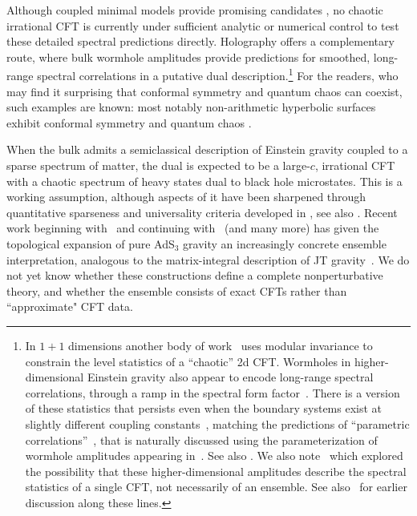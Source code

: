 \documentclass[11pt]{article}
\numberwithin{equation}{section}
\begin{document}
Although coupled minimal models provide promising candidates \cite{Antunes:2022vtb,Antunes:2024mfb}, no chaotic irrational CFT is currently under sufficient analytic or numerical control to test these detailed spectral predictions directly. Holography offers a complementary route, where bulk wormhole amplitudes provide predictions for smoothed, long-range spectral correlations in a putative dual description.\footnote{In $1+1$ dimensions another body of work~\cite{Haehl:2023tkr,DiUbaldo:2023qli,Haehl:2023xys,Haehl:2023mhf,Boruch:2025ilr} uses modular invariance to constrain the level statistics of a ``chaotic'' 2d CFT. Wormholes in higher-dimensional Einstein gravity also appear to encode long-range spectral correlations, through a ramp in the spectral form factor~\cite{Saad:2018bqo,Chen:2023hra}. There is a version of these statistics that persists even when the boundary systems exist at slightly different coupling constants~\cite{Cotler:2022rud}, matching the predictions of ``parametric correlations''~\cite{Simons:1993prb,Szafer:1993zz,Simons:1993zza}, that is naturally discussed using the parameterization of wormhole amplitudes appearing in~\cite{Cotler:2020lxj,Cotler:2021cqa}. See also \cite{Perlmutter:2026trb,Perlmutter:2026ujr}. We also note~\cite{Kudler-Flam:2026nzz,Liu:2026fnd} which explored the possibility that these higher-dimensional amplitudes describe the spectral statistics of a single CFT, not necessarily of an ensemble. See also~\cite{Pollack:2020gfa} for earlier discussion along these lines. } For the readers, who may find it surprising that conformal symmetry and quantum chaos can coexist, such examples are known: most notably non-arithmetic hyperbolic surfaces exhibit conformal symmetry\cite{Kravchuk:2021akc,Bonifacio:2023ban,Gesteau:2023brw} and quantum chaos \cite{marklof2006arithmetic,sarnak1993arithmetic}.

When the bulk admits a semiclassical description of Einstein gravity coupled to a sparse spectrum of matter, the dual is expected to be a large-$c$, irrational CFT with a chaotic spectrum of heavy states dual to black hole microstates. This is a working assumption, although aspects of it have been sharpened through quantitative sparseness and universality criteria developed in \cite{Hartman:2014oaa,Pal:2023cgk,Dey:2024nje}, see also \cite{Perlmutter:2026trb,Perlmutter:2026ujr}. Recent work beginning with~\cite{Belin:2020hea,Cotler:2020ugk,Maxfield:2020ale} and continuing with~\cite{Cotler:2020hgz,Belin:2021ryy,Chandra:2022bqq,Collier:2023fwi,Belin:2023efa,Jafferis:2025vyp} (and many more) has given the topological expansion of pure AdS$_3$ gravity an increasingly concrete ensemble interpretation, analogous to the matrix-integral description of JT gravity~\cite{Saad:2019lba}. We do not yet know whether these constructions define a complete nonperturbative theory, and whether the ensemble consists of exact CFTs rather than ``approximate" CFT data.
\end{document}
